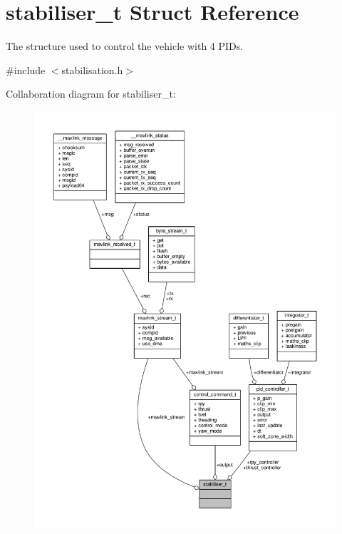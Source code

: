 \hypertarget{structstabiliser__t}{\section{stabiliser\+\_\+t Struct Reference}
\label{structstabiliser__t}
}


The structure used to control the vehicle with 4 P\+I\+Ds.  




{\ttfamily \#include $<$stabilisation.\+h$>$}



Collaboration diagram for stabiliser\+\_\+t\+:
\nopagebreak
\begin{figure}[H]
\begin{center}
\leavevmode
\includegraphics[width=350pt]{structstabiliser__t__coll__graph}
\end{center}
\end{figure}
